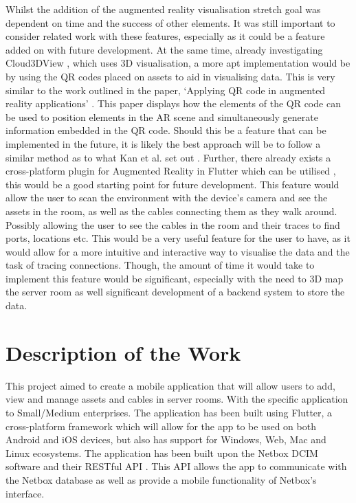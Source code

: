 \documentclass [11pt,a4paper]{article}
\begin{document}
Whilst the addition of the augmented reality visualisation stretch goal was dependent on time and the success of other elements. It was still important to consider related work with these features, especially as it could be a feature added on with future development. At the same time, already investigating Cloud3DView \cite{cloud3dview}, which uses 3D visualisation, a more apt implementation would be by using the QR codes placed on assets to aid in visualising data. This is very similar to the work outlined in the paper, `Applying QR code in augmented reality applications' \cite{applyingQR}. This paper displays how the elements of the QR code can be used to position elements in the AR scene and simultaneously generate information embedded in the QR code. Should this be a feature that can be implemented in the future, it is likely the best approach will be to follow a similar method as to what Kan et al. set out \cite{applyingQR}. Further, there already exists a cross-platform plugin for Augmented Reality in Flutter which can be utilised \cite{ar_flutter}, this would be a good starting point for future development. This feature would allow the user to scan the environment with the device's camera and see the assets in the room, as well as the cables connecting them as they walk around. Possibly allowing the user to see the cables in the room and their traces to find ports, locations etc. This would be a very useful feature for the user to have, as it would allow for a more intuitive and interactive way to visualise the data and the task of tracing connections. Though, the amount of time it would take to implement this feature would be significant, especially with the need to 3D map the server room as well significant development of a backend system to store the data.

\section{Description of the Work}
\label{sec:work}
This project aimed to create a mobile application that will allow users to add, view and manage assets and cables in server rooms. With the specific application to Small/Medium enterprises. The application has been built using Flutter, a cross-platform framework which will allow for the app to be used on both Android and iOS devices, but also has support for Windows, Web, Mac and Linux ecosystems. The application has been built upon the Netbox DCIM software \cite{Netbox} and their RESTful API \cite{NetboxAPI}. This API allows the app to communicate with the Netbox database as well as provide a mobile functionality of Netbox's interface.  
\end{document}
